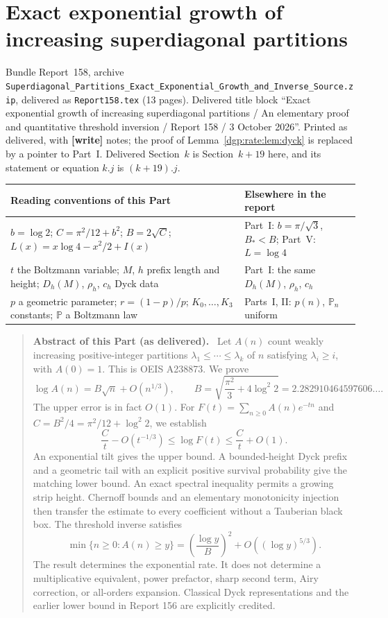 \documentclass[11pt,letterpaper]{article}
\numberwithin{equation}{section}
\theoremstyle{remark}\newtheorem{remark}[theorem]{Remark}
\newcommand{\file}[1]{\nolinkurl{#1}}
\newenvironment{partabstract}{\begin{quote}\small\noindent\textbf{Abstract of this Part (as delivered).}\ }{\end{quote}}
\newcommand{\partsource}[1]{\par\noindent\begin{minipage}{\textwidth}\small #1\end{minipage}\par\medskip}
\begin{document}
\part{Exact exponential growth of increasing superdiagonal partitions}\label{dgp:rate:part}
\partsource{Bundle Report~158, archive \file{Superdiagonal_Partitions_Exact_Exponential_Growth_and_Inverse_Source.zip}, delivered as \file{Report158.tex} (13 pages). Delivered title block ``Exact exponential growth of increasing superdiagonal partitions / An elementary proof and quantitative threshold inversion / Report 158 / 3 October 2026''. Printed as delivered, with \textbf{[write]} notes; the proof of Lemma~\ref{dgp:rate:lem:dyck} is replaced by a pointer to Part~I. Delivered Section~$k$ is Section~$k+19$ here, and its statement or equation $k.j$ is $(k+19).j$.}
\begin{center}
\small
\begin{tabular}{@{}>{\raggedright\arraybackslash}p{} >{\raggedright\arraybackslash}p{}@{}}
\toprule
Reading conventions of this Part & Elsewhere in the report\\
\midrule
$b=\log2$; $C=\pi^2/12+b^2$; $B=2\sqrt C$; $L(x)=x\log4-x^2/2+I(x)$ & Part~I: $b=\pi/\sqrt3$, $B_*<B$; Part~V: $L=\log4$\\
$t$ the Boltzmann variable; $M$, $h$ prefix length and height; $D_h(M)$, $\rho_h$, $c_h$ Dyck data & Part~I: the same $D_h(M)$, $\rho_h$, $c_h$\\
$p$ a geometric parameter; $r=(1-p)/p$; $K_0,\dots,K_3$ constants; $\mathbb P$ a Boltzmann law & Parts~I, II: $p(n)$, $\mathbb P_n$ uniform\\
\bottomrule
\end{tabular}
\end{center}
\begin{partabstract}
Let $A(n)$ count weakly increasing positive-integer partitions
$\lambda_1\leq\cdots\leq\lambda_k$ of $n$ satisfying $\lambda_i\geq i$,
with $A(0)=1$. This is OEIS A238873. We prove
\[
 \log A(n)=B\sqrt n+O(n^{1/3}),\qquad
 B=\sqrt{\frac{\pi^2}{3}+4\log^2 2}=2.282910464597606\ldots.
\]
The upper error is in fact $O(1)$. For
$F(t)=\sum_{n\geq0}A(n)e^{-tn}$ and
$C=B^2/4=\pi^2/12+\log^2 2$, we establish
\[
 \frac Ct-O(t^{-1/3})\leq\log F(t)\leq\frac Ct+O(1).
\]
An exponential tilt gives the upper bound. A bounded-height Dyck prefix
and a geometric tail with an explicit positive survival probability give
the matching lower bound. An exact spectral inequality permits a growing
strip height. Chernoff bounds and an elementary monotonicity injection
then transfer the estimate to every coefficient without a Tauberian
black box. The threshold inverse satisfies
\[
 \min\{n\geq0:A(n)\geq y\}
 =\left(\frac{\log y}{B}\right)^2+O((\log y)^{5/3}).
\]
The result determines the exponential rate. It does not determine a
multiplicative equivalent, power prefactor, sharp second term, Airy
correction, or all-orders expansion. Classical Dyck representations and
the earlier lower bound in Report 156 are explicitly credited.
\end{partabstract}
\end{document}
